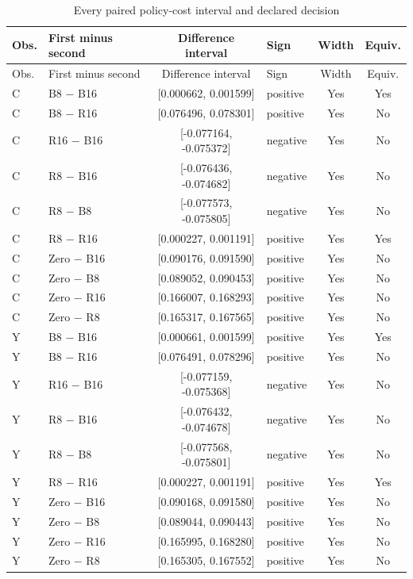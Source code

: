 {\small\setlength{\tabcolsep}{4pt}
\begin{longtable}{llclcc}
\caption{Every paired policy-cost interval and declared decision}\label{tab:all-pairs77}\\
\toprule
Obs. & First minus second & Difference interval & Sign & Width & Equiv. \\
\midrule\endfirsthead
\toprule
Obs. & First minus second & Difference interval & Sign & Width & Equiv. \\
\midrule\endhead
C & B8 $-$ B16 & [0.000662, 0.001599] & positive & Yes & Yes \\
C & B8 $-$ R16 & [0.076496, 0.078301] & positive & Yes & No \\
C & R16 $-$ B16 & [-0.077164, -0.075372] & negative & Yes & No \\
C & R8 $-$ B16 & [-0.076436, -0.074682] & negative & Yes & No \\
C & R8 $-$ B8 & [-0.077573, -0.075805] & negative & Yes & No \\
C & R8 $-$ R16 & [0.000227, 0.001191] & positive & Yes & Yes \\
C & Zero $-$ B16 & [0.090176, 0.091590] & positive & Yes & No \\
C & Zero $-$ B8 & [0.089052, 0.090453] & positive & Yes & No \\
C & Zero $-$ R16 & [0.166007, 0.168293] & positive & Yes & No \\
C & Zero $-$ R8 & [0.165317, 0.167565] & positive & Yes & No \\
Y & B8 $-$ B16 & [0.000661, 0.001599] & positive & Yes & Yes \\
Y & B8 $-$ R16 & [0.076491, 0.078296] & positive & Yes & No \\
Y & R16 $-$ B16 & [-0.077159, -0.075368] & negative & Yes & No \\
Y & R8 $-$ B16 & [-0.076432, -0.074678] & negative & Yes & No \\
Y & R8 $-$ B8 & [-0.077568, -0.075801] & negative & Yes & No \\
Y & R8 $-$ R16 & [0.000227, 0.001191] & positive & Yes & Yes \\
Y & Zero $-$ B16 & [0.090168, 0.091580] & positive & Yes & No \\
Y & Zero $-$ B8 & [0.089044, 0.090443] & positive & Yes & No \\
Y & Zero $-$ R16 & [0.165995, 0.168280] & positive & Yes & No \\
Y & Zero $-$ R8 & [0.165305, 0.167552] & positive & Yes & No \\
\bottomrule\end{longtable}}
